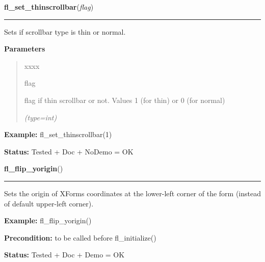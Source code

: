 \hspace{.8\funcindent}\begin{boxedminipage}{\funcwidth}

    \raggedright \textbf{fl\_set\_thinscrollbar}(\textit{flag})

    \vspace{-1.5ex}

    \rule{\textwidth}{0.5\fboxrule}
\setlength{\parskip}{2ex}
    Sets if scrollbar type is thin or normal.

\setlength{\parskip}{1ex}
      \textbf{Parameters}
      \vspace{-1ex}

      \begin{quote}
        \begin{Ventry}{xxxx}

          \item[flag]

          flag if thin scrollbar or not. Values 1 (for thin) or 0 (for 
          normal)

            {\it (type=int)}

        \end{Ventry}

      \end{quote}

\textbf{Example:} fl\_set\_thinscrollbar(1)



\textbf{Status:} Tested + Doc + NoDemo = OK



    \end{boxedminipage}

    \label{xformslib:flbasic:fl_flip_yorigin}

    \vspace{0.5ex}

\hspace{.8\funcindent}\begin{boxedminipage}{\funcwidth}

    \raggedright \textbf{fl\_flip\_yorigin}()

    \vspace{-1.5ex}

    \rule{\textwidth}{0.5\fboxrule}
\setlength{\parskip}{2ex}
    Sets the origin of XForms coordinates at the lower-left corner of the 
    form (instead of default upper-left corner).

\setlength{\parskip}{1ex}
\textbf{Example:} fl\_flip\_yorigin()



\textbf{Precondition:} to be called before fl\_initialize()



\textbf{Status:} Tested + Doc + Demo = OK



    \end{boxedminipage}

